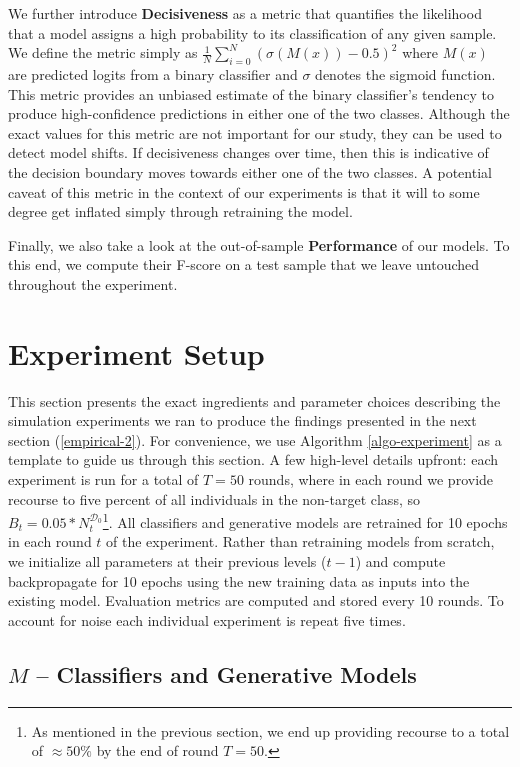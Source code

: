 \documentclass[conference,final,]{IEEEtran}
\theoremstyle{definition}
\theoremstyle{definition}
\theoremstyle{definition}
\theoremstyle{definition}
\theoremstyle{remark}
\begin{document}
We further introduce \textbf{Decisiveness} as a metric that quantifies the likelihood that a model assigns a high probability to its classification of any given sample. We define the metric simply as \({\frac{1}{N}}\sum_{i=0}^N(\sigma(M(x)) - 0.5)^2\) where \(M(x)\) are predicted logits from a binary classifier and \(\sigma\) denotes the sigmoid function. This metric provides an unbiased estimate of the binary classifier's tendency to produce high-confidence predictions in either one of the two classes. Although the exact values for this metric are not important for our study, they can be used to detect model shifts. If decisiveness changes over time, then this is indicative of the decision boundary moves towards either one of the two classes. A potential caveat of this metric in the context of our experiments is that it will to some degree get inflated simply through retraining the model.

Finally, we also take a look at the out-of-sample \textbf{Performance} of our models. To this end, we compute their F-score on a test sample that we leave untouched throughout the experiment.

\hypertarget{empirical}{%
\section{Experiment Setup}\label{empirical}}

This section presents the exact ingredients and parameter choices describing the simulation experiments we ran to produce the findings presented in the next section (\ref{empirical-2}). For convenience, we use Algorithm \ref{algo-experiment} as a template to guide us through this section. A few high-level details upfront: each experiment is run for a total of \(T=50\) rounds, where in each round we provide recourse to five percent of all individuals in the non-target class, so \(B_t=0.05 * N_t^{\mathcal{D}_0}\)\footnote{As mentioned in the previous section, we end up providing recourse to a total of \(\approx50\%\) by the end of round \(T=50\).}. All classifiers and generative models are retrained for 10 epochs in each round \(t\) of the experiment. Rather than retraining models from scratch, we initialize all parameters at their previous levels (\(t-1\)) and compute backpropagate for 10 epochs using the new training data as inputs into the existing model. Evaluation metrics are computed and stored every 10 rounds. To account for noise each individual experiment is repeat five times.

\hypertarget{empirical-classifiers}{%
\subsection{\texorpdfstring{\(M\) -- Classifiers and Generative Models}{M -- Classifiers and Generative Models}}\label{empirical-classifiers}}
\end{document}

